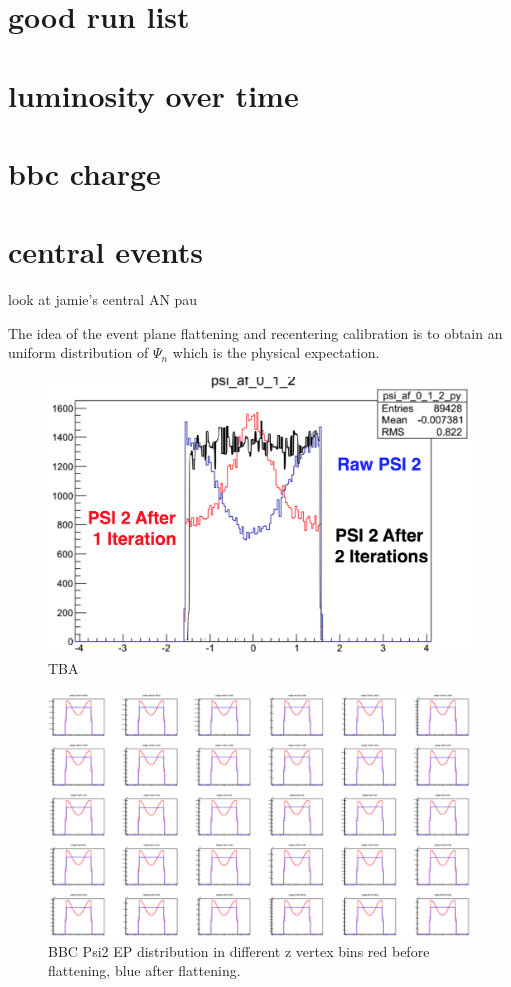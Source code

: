 \section{good run list}
\section{luminosity over time}
\section{bbc charge}
\section{central events}
look at jamie's central AN pau

The idea of the event plane flattening and recentering calibration is to obtain an uniform distribution of $\Psi_n$ which is the physical expectation.
\begin{figure}[!h]
\begin{center}
\includegraphics[width=0.65\linewidth]{figs/flatten_calib_iteration.png}
\caption{TBA}
\end{center}
\end{figure}
\begin{figure}[!h]
\begin{center}
\includegraphics[width=0.65\linewidth]{figs/bbc_ep_bf_af.png}
\caption{BBC Psi2 EP distribution in different z vertex bins red before flattening, blue after flattening.}
\end{center}
\end{figure}
